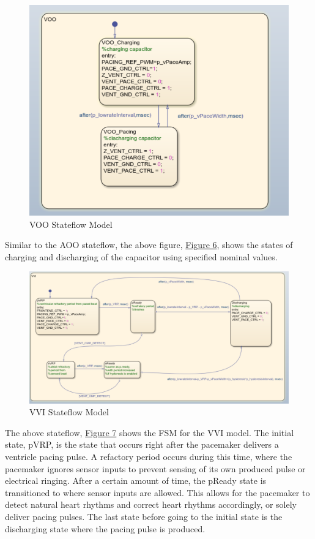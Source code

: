 \documentclass{article}
\newcounter{subsubsubsection}[subsubsection]
\begin{document}
\newpage
{}
\begin{tcolorbox}
    \begin{figure}[H]\label{VOOSF}
        \includegraphics[width=\textwidth]{VOO.png}
        \caption{VOO Stateflow Model}        
    \end{figure}
\end{tcolorbox}
Similar to the AOO stateflow, the above figure, \hyperref[VOOSF]{Figure 6}, shows the states of 
charging and discharging of the capacitor using specified nominal values. 

\newpage
{}
\begin{tcolorbox}
    \begin{figure}[H]\label{VVISF}
        \includegraphics[width=\textwidth]{VVI.png}
        \caption{VVI Stateflow Model}       
    \end{figure}
\end{tcolorbox}
The above stateflow, \hyperref[VVISF]{Figure 7} shows the FSM for the VVI model. The initial state, pVRP, is the state 
that occurs right after the pacemaker delivers a ventricle pacing pulse. A refactory period occurs during this time, where the 
pacemaker ignores sensor inputs to prevent sensing of its own produced pulse or electrical ringing. After a certain amount of time,
the pReady state is transitioned to where sensor inputs are allowed. This allows for the pacemaker to detect natural heart rhythms
and correct heart rhythms accordingly, or solely deliver pacing pulses. The last state before going to the initial state is the 
discharging state where the pacing pulse is produced. 
\end{document}
